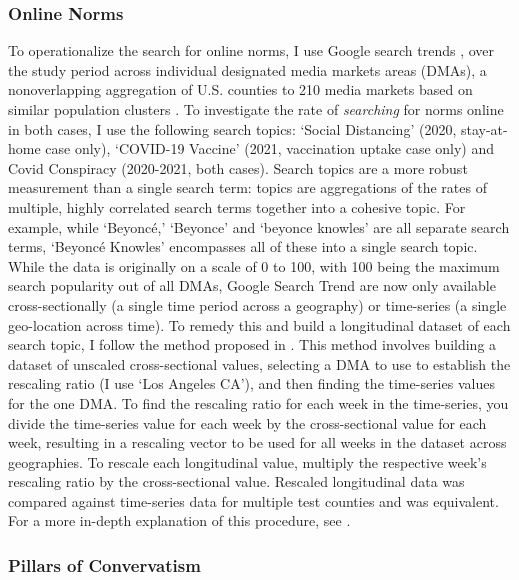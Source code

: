 \hypertarget{online-norms}{%
\subsubsection{Online Norms}\label{online-norms}}


To operationalize the search for online norms, I use Google search trends \citep{googletrends},
over the study period across individual designated media markets areas (DMAs), a
nonoverlapping aggregation of U.S. counties to 210 media markets based on
similar population clusters \citep{dma_key}. To investigate the rate of \emph{searching} for norms
online in both cases, I use the following search topics: `Social Distancing'
(2020, stay-at-home case only), `COVID-19 Vaccine' (2021, vaccination uptake case
only) and Covid Conspiracy (2020-2021, both cases). Search topics are a more
robust measurement than a single search term: topics are aggregations of the
rates of multiple, highly correlated search terms together into a cohesive
topic. For example, while `Beyoncé,' `Beyonce' and `beyonce knowles' are all
separate search terms, `Beyoncé Knowles' encompasses all of these into a single
search topic. While the data is originally on a scale of 0 to 100, with
100 being the maximum search popularity out of all DMAs, Google Search Trend are
now only available cross-sectionally (a single time period across a geography)
or time-series (a single geo-location across time). To remedy this and build a
longitudinal dataset of each search topic, I follow the method proposed in \citet[p. 5]{park_etal}.
This method involves building a dataset of unscaled
cross-sectional values, selecting a DMA to use to establish the rescaling ratio
(I use `Los Angeles CA'), and then finding the time-series values for the one
DMA. To find the rescaling ratio for each week in the time-series, you divide
the time-series value for each week by the cross-sectional value for each week,
resulting in a rescaling vector to be used for all weeks in the dataset across
geographies. To rescale each longitudinal value, multiply the respective week's
rescaling ratio by the cross-sectional value. Rescaled longitudinal data was
compared against time-series data for multiple test counties and was equivalent.
For a more in-depth explanation of this procedure, see \citet[p. 5]{park_etal}.

\hypertarget{pillars-of-convervatism}{%
\subsubsection{Pillars of Convervatism}\label{pillars-of-convervatism}}

